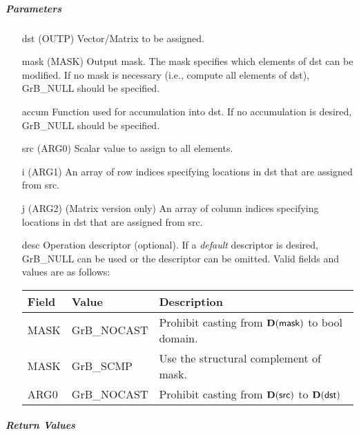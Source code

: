 \subparagraph{Parameters}

\begin{itemize}[leftmargin=1.1in]
    \item[{\sf dst}]   ({\sf OUTP}) Vector/Matrix to be assigned.

    \item[{\sf mask}] ({\sf MASK}) Output mask. The mask specifies which elements
    of {\sf dst} can be modified. If no mask is necessary (i.e., compute all
    elements of {\sf dst}), {\sf GrB\_NULL} should be specified.

    \item[{\sf accum}] Function used for accumulation into {\sf dst}.  If no accumulation
                        is desired, {\sf GrB\_NULL} should be specified.

    \item[{\sf src}]   ({\sf ARG0}) Scalar value to assign to all elements.
    \item[{\sf i}]     ({\sf ARG1}) An array of row indices specifying locations in dst that
                       are assigned from src.
    \item[{\sf j}]     ({\sf ARG2}) (Matrix version only) An array of column indices 
                       specifying locations in dst that are assigned from src.


    \item[{\sf desc}]   Operation descriptor (optional). If a
    \emph{default} descriptor is desired, {\sf GrB\_NULL} can be
    used or the descriptor can be omitted.  Valid fields and values are as follows: \\
    \begin{tabular}{lll}
    Field  & Value & Description \\
    \hline
    {\sf MASK} & {\sf GrB\_NOCAST} & Prohibit casting from $\bold{D}({\sf mask})$ to {\sf bool} domain. \\
    {\sf MASK} & {\sf GrB\_SCMP} & Use the structural complement of {\sf mask}. \\
    {\sf ARG0} & {\sf GrB\_NOCAST} & Prohibit casting from $\bold{D}({\sf src})$ to $\bold{D}({\sf dst})$ \\
    \end{tabular}

\end{itemize}

\subparagraph{Return Values}

